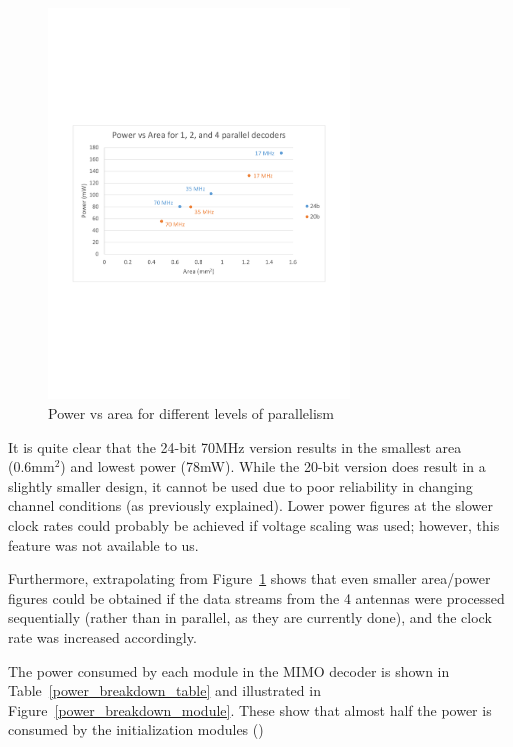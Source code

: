 \documentclass[journal]{IEEEtran}
\begin{document}
\begin{figure}[!h]
\centering
\includegraphics*[width=8cm, viewport = 60 250 560 540]{images/power_vs_area.pdf}
\caption{Power vs area for different levels of parallelism}
\label{power_vs_area}
\end{figure}

It is quite clear that the 24-bit 70MHz version results in the smallest area (0.6mm$^2$) and lowest power (78mW). While the 20-bit version does result in a slightly smaller design, it cannot be used due to poor reliability in changing channel conditions (as previously explained). Lower power figures at the slower clock rates could probably be achieved if voltage scaling was used; however, this feature was not available to us.

Furthermore, extrapolating from Figure~\ref{power_vs_area} shows that even smaller area/power figures could be obtained if the data streams from the 4 antennas were processed sequentially (rather than in parallel, as they are currently done), and the clock rate was increased accordingly.

The power consumed by each module in the MIMO decoder is shown in Table~\ref{power_breakdown_table} and illustrated in Figure~\ref{power_breakdown_module}. These show that almost half the power is consumed by the initialization modules ()
\end{document}
